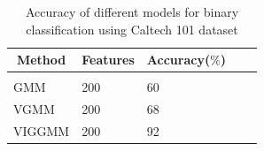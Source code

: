 \documentclass[letterpaper]{article}
\begin{document}
        
    \begin{table}[h]
        \caption{Accuracy of different models for binary classification using Caltech 101 dataset}
        \label{binary classification Caltech 101}
        \begin{center}
        \begin{tabular}{lllll}
        \multicolumn{1}{c}{\bf Method}  &\multicolumn{1}{c}{\bf Features} &\multicolumn{1}{c}{\bf Accuracy($\%$)}   \\
        \hline \\
        GMM         &200 &60 \\
        VGMM             &200  &68\\
        VIGGMM             &200  &92\\
        \end{tabular}
        \end{center}
    \end{table}
\end{document}
